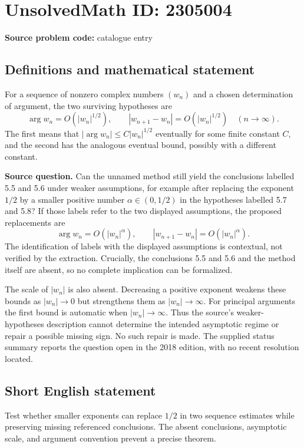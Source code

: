 \documentclass[11pt]{article}
\begin{document}
\section*{UnsolvedMath ID: 2305004}
\textbf{Source problem code:} catalogue entry
\subsection{Definitions and mathematical statement}
For a sequence of nonzero complex numbers $(w_n)$ and a chosen determination of argument, the two surviving hypotheses are
\[
\arg w_n=O(|w_n|^{1/2}),\qquad
|w_{n+1}-w_n|=O(|w_n|^{1/2})\quad(n\to\infty).
\]
The first means that $|\arg w_n|\leq C|w_n|^{1/2}$ eventually for some finite constant $C$, and the second has the analogous eventual bound, possibly with a different constant.

\textbf{Source question.} Can the unnamed method still yield the conclusions labelled 5.5 and 5.6 under weaker assumptions, for example after replacing the exponent $1/2$ by a smaller positive number $\alpha\in(0,1/2)$ in the hypotheses labelled 5.7 and 5.8? If those labels refer to the two displayed assumptions, the proposed replacements are
\[
\arg w_n=O(|w_n|^{\alpha}),\qquad
|w_{n+1}-w_n|=O(|w_n|^{\alpha}).
\]
The identification of labels with the displayed assumptions is contextual, not verified by the extraction. Crucially, the conclusions 5.5 and 5.6 and the method itself are absent, so no complete implication can be formalized.

The scale of $|w_n|$ is also absent. Decreasing a positive exponent weakens these bounds as $|w_n|\to0$ but strengthens them as $|w_n|\to\infty$. For principal arguments the first bound is automatic when $|w_n|\to\infty$. Thus the source's weaker-hypotheses description cannot determine the intended asymptotic regime or repair a possible missing sign. No such repair is made. The supplied status summary reports the question open in the 2018 edition, with no recent resolution located.
\subsection{Short English statement}
Test whether smaller exponents can replace $1/2$ in two sequence estimates while preserving missing referenced conclusions. The absent conclusions, asymptotic scale, and argument convention prevent a precise theorem.
\end{document}
